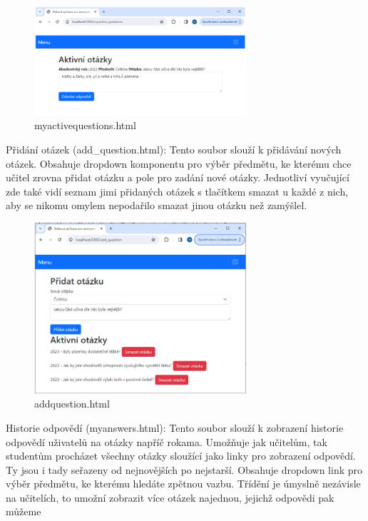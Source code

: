 \documentclass[11pt,a4paper,twoside,openright]{report}
\begin{document}
{\begin{figure}[h]
  \centering
  \includegraphics[width=0.7\textwidth]{myactivequestions}
  \caption{myactivequestions.html}
  \label{fig:obrazek}
\end{figure}

Přidání otázek (add\_question.html): Tento soubor slouží k přidávání nových otázek. Obsahuje dropdown komponentu pro výběr předmětu, ke kterému chce učitel zrovna přidat otázku a pole pro zadání nové otázky. Jednotliví vyučující zde také vidí seznam jimi přidaných otázek s tlačítkem smazat u každé z nich, aby se nikomu omylem nepodařilo smazat jinou otázku než zamýšlel. 

\begin{figure}[h]
  \centering
  \includegraphics[width=0.7\textwidth]{addquestion}
  \caption{addquestion.html}
  \label{fig:obrazek}
\end{figure}

Historie odpovědí (myanswers.html): Tento soubor slouží k zobrazení historie odpovědí uživatelů na otázky napříč rokama. Umožňuje jak učitelům, tak studentům procházet všechny otázky sloužící jako linky pro zobrazení odpovědí. Ty jsou i tady seřazeny od nejnovějších po nejstarší. Obsahuje dropdown link pro výběr předmětu, ke kterému hledáte zpětnou vazbu. Třídění je úmyslně nezávisle na učitelích, to umožní zobrazit více otázek najednou, jejichž odpovědi pak můžeme

}
\end{document}
